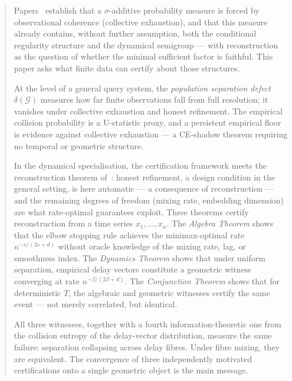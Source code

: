 
\maketitle

\begin{abstract}
Papers~\cite{mahon_paper1,mahon_paper2} establish that a $\sigma$-additive
probability measure is forced by observational coherence (collective
exhaustion), and that this measure already contains, without further
assumption, both the conditional regularity structure and the dynamical
semigroup — with reconstruction as the question of whether the minimal
sufficient factor is faithful.  This paper asks what finite data can certify
about those structures.

At the level of a general query system, the \emph{population separation
defect} $\delta(\mathcal{G})$ measures how far finite observations fall from
full resolution; it vanishes under collective exhaustion and honest refinement.
The empirical collision probability is a U-statistic proxy, and a persistent
empirical floor is evidence against collective exhaustion — a CE-shadow theorem
requiring no temporal or geometric structure.

In the dynamical specialisation, the certification framework meets the
reconstruction theorem of~\cite{mahon_paper2}: honest refinement, a design
condition in the general setting, is here automatic — a consequence of
reconstruction — and the remaining degrees of freedom (mixing rate, embedding
dimension) are what rate-optimal guarantees exploit.  Three theorems certify
reconstruction from a time series $x_1,\ldots,x_n$.  The \emph{Algebra
Theorem} shows that the elbow stopping rule achieves the minimax-optimal rate
$n^{-s/(2s+d)}$ without oracle knowledge of the mixing rate, lag, or smoothness
index.  The \emph{Dynamics Theorem} shows that under uniform separation,
empirical delay vectors constitute a geometric witness converging at rate
$n^{-\beta/(2\beta+d)}$.  The \emph{Conjunction Theorem} shows that for
deterministic $T$, the algebraic and geometric witnesses certify the same
event — not merely correlated, but identical.

All three witnesses, together with a fourth information-theoretic one from the
collision entropy of the delay-vector distribution, measure the same failure:
separation collapsing across delay fibres.  Under fibre mixing, they are
equivalent.  The convergence of three independently motivated certifications
onto a single geometric object is the main message.
\end{abstract}

